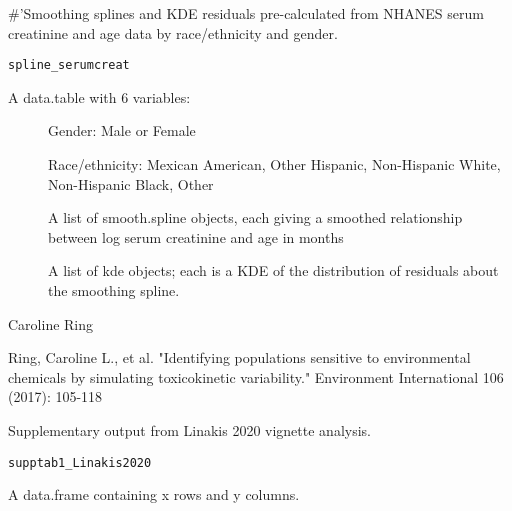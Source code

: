 \documentclass[a4paper]{book}
\begin{document}
%
\begin{Description}\relax
\#'Smoothing splines and KDE residuals pre-calculated from NHANES serum creatinine and
age data by race/ethnicity and gender.
\end{Description}
%
\begin{Usage}
\begin{verbatim}
spline_serumcreat
\end{verbatim}
\end{Usage}
%
\begin{Format}
A data.table with 6 variables: \begin{description}

\item[] Gender:
Male or Female
\item[] Race/ethnicity: Mexican American, Other
Hispanic, Non-Hispanic White, Non-Hispanic Black, Other
\item[] A list of smooth.spline objects, each giving a
smoothed relationship between log serum creatinine and age in months
\item[] A list of kde
objects; each is a KDE of the distribution of residuals about the smoothing
spline.

\end{description}

\end{Format}
%
\begin{Author}\relax
Caroline Ring
\end{Author}
%
\begin{References}\relax
Ring, Caroline L., et al. "Identifying populations sensitive to
environmental chemicals by simulating toxicokinetic variability." Environment
International 106 (2017): 105-118
\end{References}
%
\begin{Description}\relax
Supplementary output from Linakis 2020 vignette analysis.
\end{Description}
%
\begin{Usage}
\begin{verbatim}
supptab1_Linakis2020
\end{verbatim}
\end{Usage}
%
\begin{Format}
A data.frame containing x rows and y columns.
\end{Format}
\end{document}
